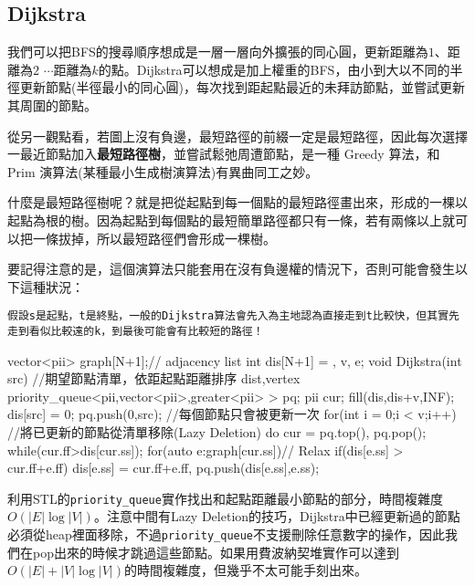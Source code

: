 \subsection{Dijkstra}
我們可以把BFS的搜尋順序想成是一層一層向外擴張的同心圓，更新距離為$1$、距離為$2$ $\cdots$距離為$k$的點。Dijkstra可以想成是加上權重的BFS，由小到大以不同的半徑更新節點(半徑最小的同心圓)，每次找到距起點最近的未拜訪節點，並嘗試更新其周圍的節點。

從另一觀點看，若圖上沒有負邊，最短路徑的前綴一定是最短路徑，因此每次選擇一最近節點加入\textbf{最短路徑樹}，並嘗試鬆弛周遭節點，是一種 Greedy 算法，和 Prim 演算法(某種最小生成樹演算法)有異曲同工之妙。

什麼是最短路徑樹呢？就是把從起點到每一個點的最短路徑畫出來，形成的一棵以起點為根的樹。因為起點到每個點的最短簡單路徑都只有一條，若有兩條以上就可以把一條拔掉，所以最短路徑們會形成一棵樹。

要記得注意的是，這個演算法只能套用在沒有負邊權的情況下，否則可能會發生以下這種狀況：

\begin{center}
\end{center}

\texttt{假設s是起點，t是終點，一般的Dijkstra算法會先入為主地認為直接走到t比較快，但其實先走到看似比較遠的k，到最後可能會有比較短的路徑！}

\begin{C++}
vector<pii> graph[N+1];// adjacency list
int dis[N+1] = {}, v, e;
void Dijkstra(int src){
	//期望節點清單，依距起點距離排序 {dist,vertex}
	priority_queue<pii,vector<pii>,greater<pii> > pq;
	pii cur;
	fill(dis,dis+v,INF);
	dis[src] = 0;
	pq.push({0,src});
	//每個節點只會被更新一次
	for(int i = 0;i < v;i++){
		//將已更新的節點從清單移除(Lazy Deletion)
		do cur = pq.top(), pq.pop();
		while(cur.ff>dis[cur.ss]);
		for(auto e:graph[cur.ss])// Relax
			if(dis[e.ss] > cur.ff+e.ff)
				dis[e.ss] = cur.ff+e.ff,
			pq.push({dis[e.ss],e.ss});
	}
}
\end{C++}
利用STL的\texttt{priority\_queue}實作找出和起點距離最小節點的部分，時間複雜度$O(|E|\log|V|)$。注意中間有Lazy Deletion的技巧，Dijkstra中已經更新過的節點必須從heap裡面移除，不過\texttt{priority\_queue}不支援刪除任意數字的操作，因此我們在pop出來的時候才跳過這些節點。如果用費波納契堆實作可以達到$O(|E|+|V|\log|V|)$的時間複雜度，但幾乎不太可能手刻出來。

